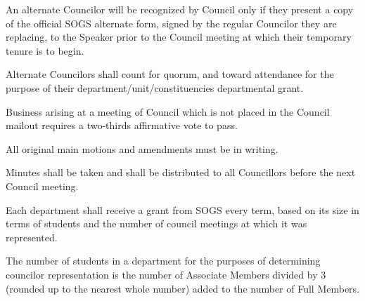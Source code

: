 \begin{longenum}[ label*=\thesubsection.\arabic*., align=left]
\begin{longenum}[ label*=\arabic*., align=left]
        \item An alternate Councilor will be recognized by Council only if they present a copy of the official SOGS alternate form, signed by the regular Councilor they are replacing, to the Speaker prior to the Council meeting at which their temporary tenure is to begin. 
        \item Alternate Councilors shall count for quorum, and toward attendance for the purpose of their department/unit/constituencies departmental grant. 
	\end{longenum}
    \item Business arising at a meeting of Council which is not placed in the Council mailout requires a two-thirds affirmative vote to pass.

    \item All original main motions and amendments must be in writing.
    \item Minutes shall be taken and shall be distributed to all Councillors before the next Council meeting.
    \item Each department shall receive a grant from SOGS every term, based on its size in terms of students and the number of council meetings at which it was represented.
    \item The number of students in a department for the purposes of determining councilor representation is the number of Associate Members divided by 3 (rounded up to the nearest whole number) added to the number of Full Members. 


\end{longenum}
